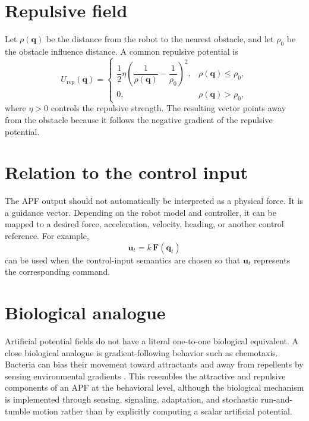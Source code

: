 \documentclass[a4paper]{article}
\begin{document}
   \section{Repulsive field}
      Let \(\rho(\mathbf q)\) be the distance from the robot to the nearest obstacle, and let \(\rho_0\) be the obstacle influence distance. A common repulsive potential is
      \[
         U_{\mathrm{rep}}(\mathbf q)
         =
         \begin{cases}
            \dfrac{1}{2}\eta
            \left(
               \dfrac{1}{\rho(\mathbf q)}
               -
               \dfrac{1}{\rho_0}
            \right)^2,
            & \rho(\mathbf q)\leq \rho_0,\\[8pt]
            0,
            & \rho(\mathbf q)>\rho_0,
         \end{cases}
      \]
      where \(\eta>0\) controls the repulsive strength. The resulting vector points away from the obstacle because it follows the negative gradient of the repulsive potential.

   \section{Relation to the control input}
      The APF output should not automatically be interpreted as a physical force. It is a guidance vector. Depending on the robot model and controller, it can be mapped to a desired force, acceleration, velocity, heading, or another control reference. For example,
      \[
         \mathbf u_t
         =
         k\,\mathbf F(\mathbf q_t)
      \]
      can be used when the control-input semantics are chosen so that \(\mathbf u_t\) represents the corresponding command.

   \section{Biological analogue}
      Artificial potential fields do not have a literal one-to-one biological equivalent. A close biological analogue is gradient-following behavior such as chemotaxis. Bacteria can bias their movement toward attractants and away from repellents by sensing environmental gradients \cite{hu-2014-bacterial-navigation-gradients}. This resembles the attractive and repulsive components of an APF at the behavioral level, although the biological mechanism is implemented through sensing, signaling, adaptation, and stochastic run-and-tumble motion rather than by explicitly computing a scalar artificial potential.
\end{document}
